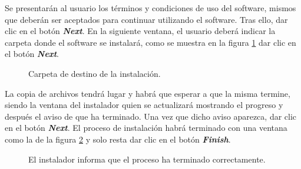 Se presentarán al usuario los términos y condiciones de uso del software, mismos que deberán ser aceptados para continuar utilizando el software. Tras ello, dar clic en el botón \textit{\textbf{Next}}. En la siguiente ventana, el usuario deberá indicar la carpeta donde el software se instalará, como se muestra en la figura \ref{fig:DirIn} dar clic en el botón \textit{\textbf{Next}}.

\begin{figure}[H] %
\caption{Carpeta de destino de la instalación.}
\label{fig:DirIn}
\end{figure}

La copia de archivos tendrá lugar y habrá que esperar a que la misma termine, siendo la ventana del instalador quien se actualizará mostrando el progreso y después el aviso de que ha terminado. Una vez que dicho aviso aparezca, dar clic en el botón \textit{\textbf{Next}}. El proceso de instalación habrá terminado con una ventana como la de la figura \ref{fig:InstEnd} y solo resta dar clic en el botón \textit{\textbf{Finish}}.

\begin{figure}[H] %
\caption{El instalador informa que el proceso ha terminado correctamente.}
\label{fig:InstEnd}
\end{figure}

